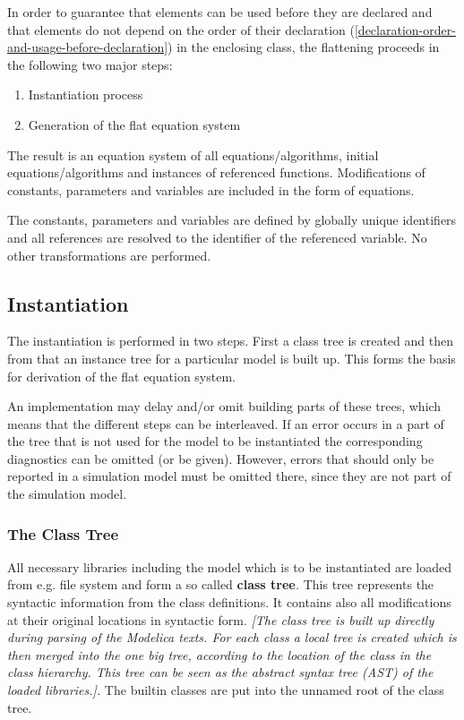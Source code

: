 \documentclass[10pt,a4paper]{report}
\def\doublelabel#1{\label{#1}}
\renewcommand{\labelenumi}{\arabic{enumi}.}
\begin{document}
In order to guarantee that elements can be used before they are declared
and that elements do not depend on the order of their declaration
(\ref{declaration-order-and-usage-before-declaration}) in the enclosing class, the flattening proceeds in the
following two major steps:

\begin{enumerate}
\def\labelenumi{\arabic{enumi}.}
\item
  Instantiation process
\item
  Generation of the flat equation system
\end{enumerate}

The result is an equation system of all equations/algorithms, initial
equations/algorithms and instances of referenced functions.
Modifications of constants, parameters and variables are included in the
form of equations.

The constants, parameters and variables are defined by globally unique
identifiers and all references are resolved to the identifier of the
referenced variable. No other transformations are performed.

\subsection{Instantiation}\doublelabel{instantiation}

The instantiation is performed in two steps. First a class tree is
created and then from that an instance tree for a particular model is
built up. This forms the basis for derivation of the flat equation
system.

An implementation may delay and/or omit building parts of these trees,
which means that the different steps can be interleaved. If an error
occurs in a part of the tree that is not used for the model to be
instantiated the corresponding diagnostics can be omitted (or be given).
However, errors that should only be reported in a simulation model must
be omitted there, since they are not part of the simulation model.

\subsubsection{The Class Tree}\doublelabel{the-class-tree}

All necessary libraries including the model which is to be instantiated
are loaded from e.g. file system and form a so called \textbf{class
tree}\emph{.} This tree represents the syntactic information from the
class definitions. It contains also all modifications at their original
locations in syntactic form. \emph{{[}The class tree is built up
directly during parsing of the Modelica texts. For each class a local
tree is created which is then merged into the one big tree, according to
the location of the class in the class hierarchy. This tree can be seen
as the abstract syntax tree (AST) of the loaded libraries.{]}.} The
builtin classes are put into the unnamed root of the class tree.
\end{document}
